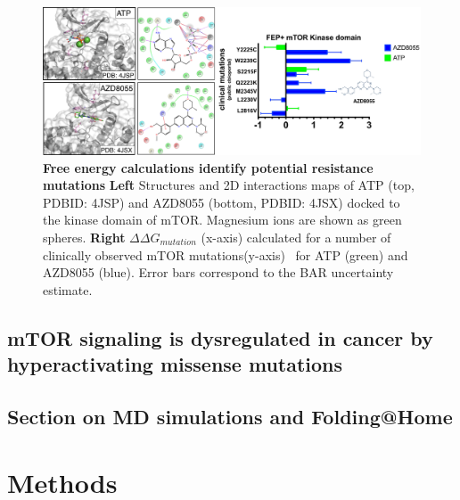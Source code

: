 \documentclass[phd,tocprelim]{cornell}
\begin{document}
\begin{landscape}
	\begin{figure}[p]
		\centering
		\includegraphics[width=1.0\linewidth]{figures/mtor-fig7.pdf}
		\caption[Free energy calculations identify potential resistance mutations]{
			{\bf Free energy calculations identify potential resistance mutations}
			{\bf Left} Structures and 2D interactions maps of ATP (top, PDBID: 4JSP) and AZD8055 (bottom, PDBID: 4JSX) docked to the kinase domain of mTOR. Magnesium ions are shown as green spheres.  {\bf Right} $\Delta \Delta G_{mutation}$ (x-axis) calculated for a number of clinically observed mTOR mutations(y-axis)~\citep{Zehir:Nat.Med.:2017} for ATP (green) and AZD8055 (blue). Error bars correspond to the BAR uncertainty estimate. 
		}
		\label{fig:mtor-figure7}
	\end{figure}
\end{landscape}

\subsection{mTOR signaling is dysregulated in cancer by hyperactivating missense mutations}


\subsection{Section on MD simulations and Folding@Home}
\section{Methods}
\end{document}

